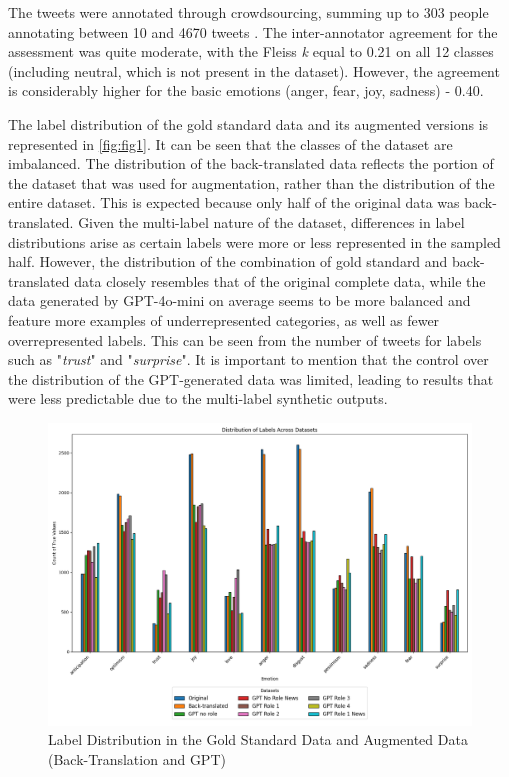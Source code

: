\documentclass[manuscript]{clv3}
\begin{document}
The tweets were annotated through crowdsourcing, summing up to 303 people annotating between 10 and 4670 tweets \cite{mohammad-kiritchenko-2018-understanding}. The inter-annotator agreement for the assessment was quite moderate, with the Fleiss \textit{k} equal to 0.21 on all 12 classes (including neutral, which is not present in the dataset). However, the agreement is considerably higher for the basic emotions (anger, fear, joy, sadness) -  0.40.

The label distribution of the gold standard data and its augmented versions is represented in \autoref{fig:fig1}. It can be seen that the classes of the dataset are imbalanced. The distribution of the back-translated data reflects the portion of the dataset that was used for augmentation, rather than the distribution of the entire dataset. This is expected because only half of the original data was back-translated. Given the multi-label nature of the dataset, differences in label distributions arise as certain labels were more or less represented in the sampled half. However, the distribution of the combination of gold standard and back-translated data closely resembles that of the original complete data, while the data generated by GPT-4o-mini on average seems to be more balanced and feature more examples of underrepresented categories, as well as fewer overrepresented labels. This can be seen from the number of tweets for labels such as "\textit{trust}" and "\textit{surprise}". It is important to mention that the control over the distribution of the GPT-generated data was limited, leading to results that were less predictable due to the multi-label synthetic outputs.
\begin{figure}
    \centering
    \includegraphics[width=1\linewidth]{label_distribution_comparison.png}
    \caption{Label Distribution in the Gold Standard Data and Augmented Data (Back-Translation and GPT)}
    \label{fig:fig1}
\end{figure}
\end{document}
